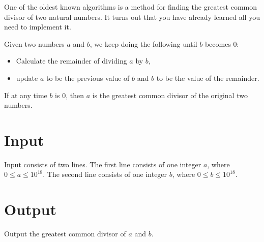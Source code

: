 
One of the oldest known algorithms
is a method for finding the greatest common divisor of two natural numbers.
It turns out that you have already learned all you need to implement it.

Given two numbers $a$ and $b$,
we keep doing the following until $b$ becomes $0$:
\begin{itemize}
    \item Calculate the remainder of dividing $a$ by $b$,
    \item update $a$ to be the previous value of $b$ and $b$ to be the value of the remainder.
\end{itemize}
If at any time $b$ is $0$, then $a$ is the greatest common divisor of the original two numbers.

\section*{Input}
Input consists of two lines.
The first line consists of one integer $a$, where $0 \leq a \leq 10^{18}$.
The second line consists of one integer $b$, where $0 \leq b \leq 10^{18}$.

\section*{Output}
Output the greatest common divisor of $a$ and $b$.
